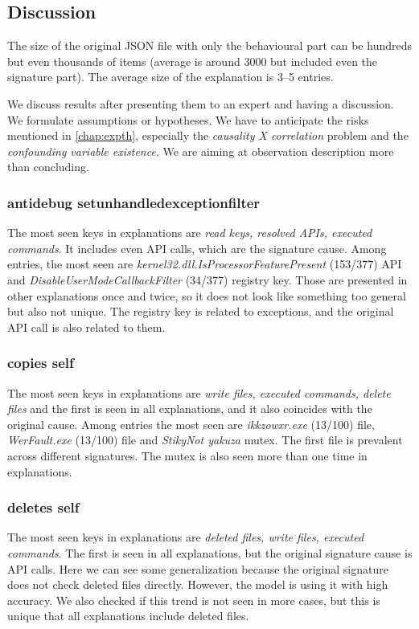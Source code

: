\subsection{Discussion}
The size of the original JSON file with only the behavioural part can be hundreds but even thousands of items (average is around $3000$ but included even the signature part). The average size of the explanation is 3--5 entries.

We discuss results after presenting them to an expert and having a discussion. We formulate assumptions or hypotheses. We have to anticipate the risks mentioned in \ref{chap:expth}, especially the \emph{causality X correlation} problem and the \emph{confounding variable existence}. We are aiming at observation description more than concluding.

\subsubsection*{antidebug setunhandledexceptionfilter}
The most seen keys in explanations are \emph{read keys, resolved APIs, executed commands}. It includes even API calls, which are the signature cause. Among entries, the most seen are \emph{kernel32.dll.IsProcessorFeaturePresent} (153/377) API and \emph{DisableUserModeCallbackFilter} (34/377) registry key. Those are presented in other explanations once and twice, so it does not look like something too general but also not unique. The registry key is related to exceptions, and the original API call is also related to them.

\subsubsection*{copies self}
The most seen keys in explanations are \emph{write files, executed commands, delete files} and the first is seen in all explanations, and it also coincides with the original cause. Among entries the most seen are \emph{ikkzowxr.exe} (13/100) file, \emph{WerFault.exe} (13/100) file and \emph{StikyNot yakuza} mutex. The first file is prevalent across different signatures. The mutex is also seen more than one time in explanations.

\subsubsection*{deletes self}
The most seen keys in explanations are \emph{deleted files, write files, executed commands}. The first is seen in all explanations, but the original signature cause is API calls. Here we can see some generalization because the original signature does not check deleted files directly. However, the model is using it with high accuracy. We also checked if this trend is not seen in more cases, but this is unique that all explanations include deleted files.

